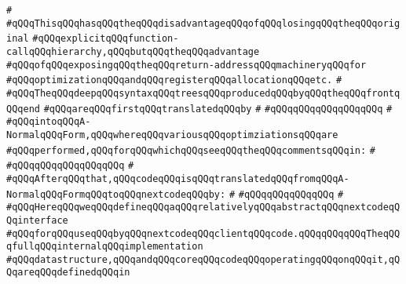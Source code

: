 \verb|#|\newline
\verb|#qQQqThisqQQqhasqQQqtheqQQqdisadvantageqQQqofqQQqlosingqQQqtheqQQqoriginal|\newline
\verb|#qQQqexplicitqQQqfunction-callqQQqhierarchy,qQQqbutqQQqtheqQQqadvantage|\newline
\verb|#qQQqofqQQqexposingqQQqtheqQQqreturn-addressqQQqmachineryqQQqfor|\newline
\verb|#qQQqoptimizationqQQqandqQQqregisterqQQqallocationqQQqetc.|\newline
\verb|#|\newline
\verb|#qQQqTheqQQqdeepqQQqsyntaxqQQqtreesqQQqproducedqQQqbyqQQqtheqQQqfrontqQQqend|\newline
\verb|#qQQqareqQQqfirstqQQqtranslatedqQQqby|\newline
\verb|#|\newline
\verb|#qQQqqQQqqQQqqQQqqQQq|\newline
\verb|#|\newline
\verb|#qQQqintoqQQqA-NormalqQQqForm,qQQqwhereqQQqvariousqQQqoptimziationsqQQqare|\newline
\verb|#qQQqperformed,qQQqforqQQqwhichqQQqseeqQQqtheqQQqcommentsqQQqin:|\newline
\verb|#|\newline
\verb|#qQQqqQQqqQQqqQQqqQQq|\newline
\verb|#|\newline
\verb|#qQQqAfterqQQqthat,qQQqcodeqQQqisqQQqtranslatedqQQqfromqQQqA-NormalqQQqFormqQQqtoqQQqnextcodeqQQqby:|\newline
\verb|#|\newline
\verb|#qQQqqQQqqQQqqQQq|\newline
\verb|#|\newline
\verb|#qQQqHereqQQqweqQQqdefineqQQqaqQQqrelativelyqQQqabstractqQQqnextcodeqQQqinterface|\newline
\verb|#qQQqforqQQquseqQQqbyqQQqnextcodeqQQqclientqQQqcode.qQQqqQQqqQQqTheqQQqfullqQQqinternalqQQqimplementation|\newline
\verb|#qQQqdatastructure,qQQqandqQQqcoreqQQqcodeqQQqoperatingqQQqonqQQqit,qQQqareqQQqdefinedqQQqin|\newline
